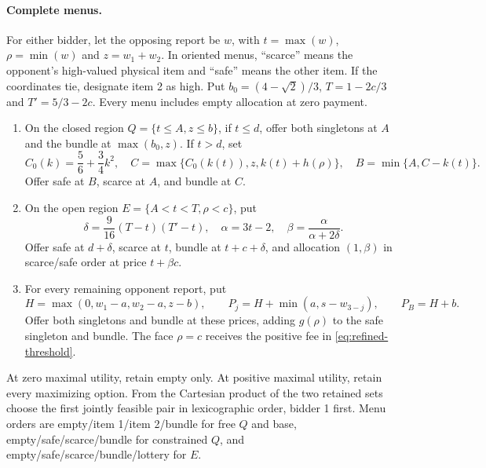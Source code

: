 \paragraph{Complete menus.}
For either bidder, let the opposing report be $w$, with
$t=\max(w)$, $\rho=\min(w)$ and $z=w_1+w_2$. In oriented menus,
``scarce'' means the opponent's high-valued physical item and ``safe''
means the other item. If the coordinates tie, designate item 2 as high.
Put $b_0=(4-\sqrt2)/3$, $T=1-2c/3$ and $T'=5/3-2c$.
Every menu includes empty allocation at zero payment.
\begin{enumerate}
\item On the closed region $Q=\{t\le A,z\le b\}$, if $t\le d$,
offer both singletons at $A$ and the bundle at $\max(b_0,z)$.
If $t>d$, set
\[
 C_0(k)=\frac56+\frac34k^2,\quad
 C=\max\{C_0(k(t)),z,k(t)+h(\rho)\},\quad
 B=\min\{A,C-k(t)\}.
\]
Offer safe at $B$, scarce at $A$, and bundle at $C$.
\item On the open region $E=\{A<t<T,\rho<c\}$, put
\[
 \delta=\frac9{16}(T-t)(T'-t),\quad \alpha=3t-2,
 \quad\beta=\frac{\alpha}{\alpha+2\delta}.
\]
Offer safe at $d+\delta$, scarce at $t$, bundle at $t+c+\delta$,
and allocation $(1,\beta)$ in scarce/safe order at price $t+\beta c$.
\item For every remaining opponent report, put
\[
 H=\max(0,w_1-a,w_2-a,z-b),\qquad
 P_j=H+\min(a,s-w_{3-j}),\qquad P_B=H+b.
\]
Offer both singletons and bundle at these prices, adding $g(\rho)$
to the safe singleton and bundle. The face $\rho=c$ receives the
positive fee in \eqref{eq:refined-threshold}.
\end{enumerate}
At zero maximal utility, retain empty only. At positive maximal utility,
retain every maximizing option. From the Cartesian product of the two
retained sets choose the first jointly feasible pair in lexicographic
order, bidder 1 first. Menu orders are empty/item 1/item 2/bundle for free
$Q$ and base, empty/safe/scarce/bundle for constrained $Q$, and
empty/safe/scarce/bundle/lottery for $E$.

